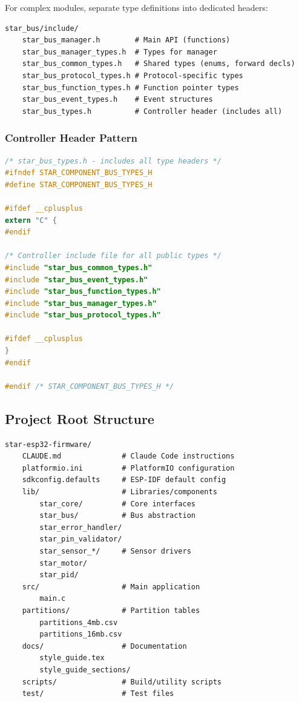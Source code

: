 For complex modules, separate type definitions into dedicated headers:

\begin{verbatim}
star_bus/include/
    star_bus_manager.h        # Main API (functions)
    star_bus_manager_types.h  # Types for manager
    star_bus_common_types.h   # Shared types (enums, forward decls)
    star_bus_protocol_types.h # Protocol-specific types
    star_bus_function_types.h # Function pointer types
    star_bus_event_types.h    # Event structures
    star_bus_types.h          # Controller header (includes all)
\end{verbatim}

\subsubsection{Controller Header Pattern}

\begin{lstlisting}[language=C]
/* star_bus_types.h - includes all type headers */
#ifndef STAR_COMPONENT_BUS_TYPES_H
#define STAR_COMPONENT_BUS_TYPES_H

#ifdef __cplusplus
extern "C" {
#endif

/* Controller include file for all public types */
#include "star_bus_common_types.h"
#include "star_bus_event_types.h"
#include "star_bus_function_types.h"
#include "star_bus_manager_types.h"
#include "star_bus_protocol_types.h"

#ifdef __cplusplus
}
#endif

#endif /* STAR_COMPONENT_BUS_TYPES_H */
\end{lstlisting}

\subsection{Project Root Structure}

\begin{verbatim}
star-esp32-firmware/
    CLAUDE.md              # Claude Code instructions
    platformio.ini         # PlatformIO configuration
    sdkconfig.defaults     # ESP-IDF default config
    lib/                   # Libraries/components
        star_core/         # Core interfaces
        star_bus/          # Bus abstraction
        star_error_handler/
        star_pin_validator/
        star_sensor_*/     # Sensor drivers
        star_motor/
        star_pid/
    src/                   # Main application
        main.c
    partitions/            # Partition tables
        partitions_4mb.csv
        partitions_16mb.csv
    docs/                  # Documentation
        style_guide.tex
        style_guide_sections/
    scripts/               # Build/utility scripts
    test/                  # Test files
\end{verbatim}

